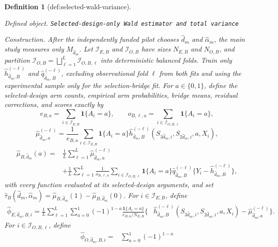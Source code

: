 \documentclass{article}
\newtheorem{definition}{Definition}
\begin{document}
\begin{definition}[def:selected-wald-variance]\label{def:selected-wald-variance}
\par\smallskip\noindent\emph{Defined object.} \texttt{Selected-\allowbreak{}design-\allowbreak{}only Wald estimator and total variance}
\par\smallskip\noindent\emph{Construction.} After the independently funded pilot chooses \(\widehat d_m\) and \(\widehat\alpha_m\), the main study measures only \(M_{\widehat d_m}\). Let \(\mathcal I_{E,B}\) and \(\mathcal I_{O,B}\) have sizes \(N_{E,B}\) and \(N_{O,B}\), and partition \(\mathcal I_{O,B}=\bigsqcup_{\ell=1}^L\mathcal I_{O,B,\ell}\) into deterministic balanced folds. Train only \(\widehat h_{\widehat d_m,B}^{(-\ell)}\) and \(\widehat q_{\widehat d_m,B}^{(-\ell)}\), excluding observational fold \(\ell\) from both fits and using the experimental sample only for the selection-bridge fit. For \(a\in\{0,1\}\), define the selected-design arm counts, empirical arm probabilities, bridge means, residual corrections, and scores exactly by
\[
e_{B,a}=\sum_{i\in\mathcal I_{E,B}}\mathbf1\{A_i=a\},
\qquad
o_{B,\ell,a}=\sum_{i\in\mathcal I_{O,B,\ell}}\mathbf1\{A_i=a\},
\]
\[
\widehat\mu_{\widehat d_m,a}^{(-\ell)}
=\frac1{e_{B,a}}\sum_{i\in\mathcal I_{E,B}}\mathbf1\{A_i=a\}
\widehat h_{\widehat d_m,B}^{(-\ell)}(S_{3\widehat d_m,i},S_{2\widehat d_m,i},a,X_i),
\]
\[
\begin{aligned}
\widehat\mu_{B,\widehat d_m}(a)
={}&\frac1L\sum_{\ell=1}^L\widehat\mu_{\widehat d_m,a}^{(-\ell)}\\
&+\frac1L\sum_{\ell=1}^L\frac1{o_{B,\ell,a}}
\sum_{i\in\mathcal I_{O,B,\ell}}\mathbf1\{A_i=a\}\widehat q_{\widehat d_m,B}^{(-\ell)}
\{Y_i-\widehat h_{\widehat d_m,B}^{(-\ell)}\},
\end{aligned}
\]
with every function evaluated at its selected-design arguments, and set \(\widehat\tau_B(\widehat d_m,\widehat\alpha_m)=\widehat\mu_{B,\widehat d_m}(1)-\widehat\mu_{B,\widehat d_m}(0)\). For \(i\in\mathcal I_{E,B}\), define
\[
\begin{aligned}
\widehat\phi_{E,\widehat d_m,B,i}
=\frac1L\sum_{\ell=1}^L\sum_{a=0}^1(-1)^{1-a}
\frac{\mathbf1\{A_i=a\}}{e_{B,a}/N_{E,B}}
\bigl\{&\widehat h_{\widehat d_m,B}^{(-\ell)}
(S_{3\widehat d_m,i},S_{2\widehat d_m,i},a,X_i)
-\widehat\mu_{\widehat d_m,a}^{(-\ell)}\bigr\}.
\end{aligned}
\]
For \(i\in\mathcal I_{O,B,\ell}\), define
\[
\begin{aligned}
\widehat\phi_{O,\widehat d_m,B,i}
={}&\sum_{a=0}^1(-1)^{1-a}

\end{aligned}\]
\end{definition}
\end{document}

